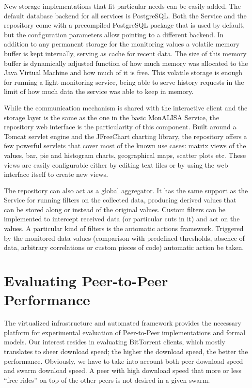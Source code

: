 New storage implementations that fit particular needs can be easily added. The
default database backend for all services is PostgreSQL. Both the Service and
the repository come with a precompiled PostgreSQL package that is used by
default, but the configuration parameters allow pointing to a different
backend. In addition to any permanent storage for the monitoring values a
volatile memory buffer is kept internally, serving as cache for recent data.
The size of this memory buffer is dynamically adjusted function of how much
memory was allocated to the Java Virtual Machine and how much of it is free.
This volatile storage is enough for running a light monitoring service, being
able to serve history requests in the limit of how much data the service was
able to keep in memory.

While the communication mechanism is shared with the interactive client and
the storage layer is the same as the one in the basic MonALISA Service, the
repository web interface is the particularity of this component. Built around
a Tomcat servlet engine and the JFreeChart charting library, the repository
offers a few powerful servlets that cover most of the known use cases: matrix
views of the values, bar, pie and histogram charts, geographical maps, scatter
plots etc. These views are easily configurable either by editing text files or
by using the web interface itself to create new views.

The repository can also act as a global aggregator. It has the same support as
the Service for running filters on the collected data, producing derived
values that can be stored along or instead of the original values. Custom
filters can be implemented to intercept received data (or particular cuts in
it) and act on the values. A particular kind of filters is the automatic
actions framework. Triggered by the monitored data values (comparison with
predefined thresholds, absence of data, arbitrary correlations or custom
pieces of code) automatic action be taken.

\section{Evaluating Peer-to-Peer Performance}
\label{sec:proto-measure:eval-swarm}

The virtualized infrastructure and automated framework provides the necessary
platform for experimental evaluation of Peer-to-Peer implementations and
formal models. Our interest resides in evaluating BitTorrent clients, which
mostly translates to sheer download speed; the higher the download speed, the
better the performance. Obviously, we have to take into account both peer
download speed and swarm download speed. A peer with high download speed that
more or less ``free rides'' on top of the other peers is not desired in a
given swarm.

